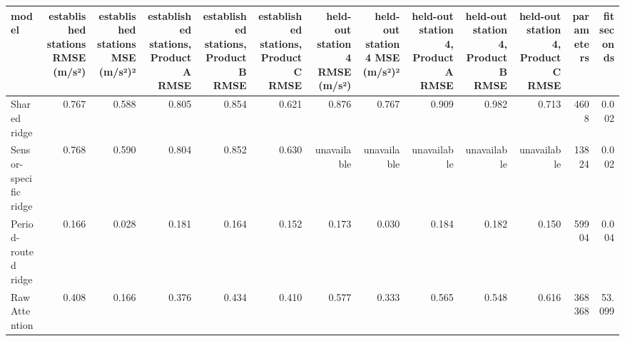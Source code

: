 \begin{tabular}{lrrrrrrrrrrrr}
\toprule
model & established stations RMSE (m/s²) & established stations MSE (m/s²)² & established stations, Product A RMSE & established stations, Product B RMSE & established stations, Product C RMSE & held-out station 4 RMSE (m/s²) & held-out station 4 MSE (m/s²)² & held-out station 4, Product A RMSE & held-out station 4, Product B RMSE & held-out station 4, Product C RMSE & parameters & fit seconds \\
\midrule
Shared ridge & 0.767 & 0.588 & 0.805 & 0.854 & 0.621 & 0.876 & 0.767 & 0.909 & 0.982 & 0.713 & 4608 & 0.002 \\
Sensor-specific ridge & 0.768 & 0.590 & 0.804 & 0.852 & 0.630 & unavailable & unavailable & unavailable & unavailable & unavailable & 13824 & 0.002 \\
Period-routed ridge & 0.166 & 0.028 & 0.181 & 0.164 & 0.152 & 0.173 & 0.030 & 0.184 & 0.182 & 0.150 & 59904 & 0.004 \\
Raw Attention & 0.408 & 0.166 & 0.376 & 0.434 & 0.410 & 0.577 & 0.333 & 0.565 & 0.548 & 0.616 & 368368 & 53.099 \\
\bottomrule
\end{tabular}
